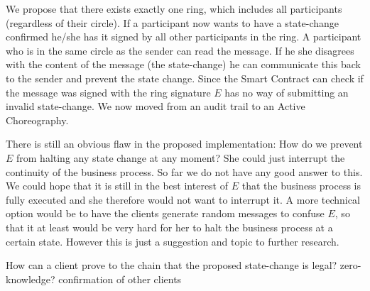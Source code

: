 \documentclass[runningheads]{llncs}
\begin{document}
We propose that there exists exactly one ring, which includes all participants (regardless of their circle). If a participant now wants to have a state-change confirmed he/she has it signed by all other participants in the ring. A participant who is in the same circle as the sender can read the message. If he she disagrees with the content of the message (the state-change) he can communicate this back to the sender and prevent the state change. Since the Smart Contract can check if the message was signed with the ring signature $E$ has no way of submitting an invalid state-change. We now moved from an audit trail to an Active Choreography. 

There is still an obvious flaw in the proposed implementation: How do we prevent $E$ from halting any state change at any moment? She could just interrupt the continuity of the business process. So far we do not have any good answer to this. We could hope that it is still in the best interest of $E$ that the business process is fully executed and she therefore would not want to interrupt it. A more technical option would be to have the clients generate random messages to confuse $E$, so that it at least would be very hard for her to halt the business process at a certain state. However this is just a suggestion and topic to further research.


How can a client prove to the chain that the proposed state-change is legal?
zero-knowledge?
confirmation of other clients
\end{document}
